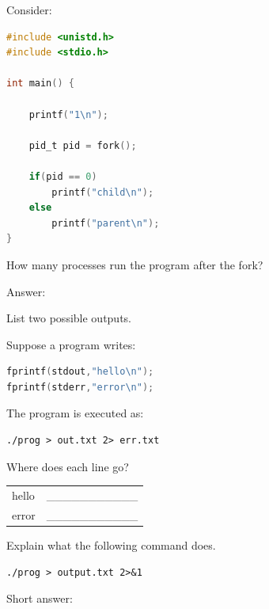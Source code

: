 \begin{questions}
	Consider:

	\begin{lstlisting}[language=C]
#include <unistd.h>
#include <stdio.h>

int main() {

    printf("1\n");

    pid_t pid = fork();

    if(pid == 0)
        printf("child\n");
    else
        printf("parent\n");
}
\end{lstlisting}

	How many processes run the program after the fork?

	Answer:

	\vspace{1cm}

	List two possible outputs.

	\vspace{3cm}

	\question[12]

	Suppose a program writes:

	\begin{lstlisting}[language=C]
fprintf(stdout,"hello\n");
fprintf(stderr,"error\n");
\end{lstlisting}

	The program is executed as:

	\begin{verbatim}
./prog > out.txt 2> err.txt
\end{verbatim}

	Where does each line go?

	\begin{center}
		\begin{tabular}{l l}
			hello & \_\_\_\_\_\_\_\_\_\_\_ \\
			error & \_\_\_\_\_\_\_\_\_\_\_
		\end{tabular}
	\end{center}

	\question[12]

	Explain what the following command does.

	\begin{verbatim}
./prog > output.txt 2>&1
\end{verbatim}

	Short answer:

	\vspace{3cm}

	\question[15]


\end{questions}
